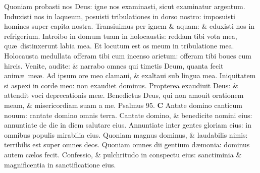 \documentclass[a5paper,10pt]{book}
\def\ae{æ}
\begin{document}
\begin{multicols*}{2}
\newline \color{red} Q\color{black}uoniam probasti nos Deus: igne nos examinasti, sicut examinatur argentum.
\newline \color{red} I\color{black}nduxisti nos in laqueum, posuisti tribulationes in dorso nostro: imposuisti homines super capita nostra.
\newline \color{red} T\color{black}ransiuimus per ignem \& aquam: \& eduxisti nos in refrigerium.
\newline \color{red} I\color{black}ntroibo in domum tuam in holocaustis: reddam tibi vota mea, qu\ae \ distinxerunt labia mea.
\newline \color{red} E\color{black}t locutum est os meum in tribulatione mea.
\newline \color{red} H\color{black}olocausta medullata offeram tibi cum incenso arietum: offeram tibi boues cum hircis.
\newline \color{red} V\color{black}enite, audite: \& narrabo omnes qui timetis Deum, quanta fecit anim\ae \ me\ae .
\newline \color{red} A\color{black}d ipsum ore meo clamaui, \& exaltaui sub lingua mea.%
\newline \color{red} I\color{black}niquitatem si aspexi in corde meo: non exaudiet dominus.
\newline \color{red} P\color{black}ropterea exaudiuit Deus: \& attendit voci deprecationis me\ae .
\newline \color{red} B\color{black}enedictus Deus, qui non amouit orationem meam, \& misericordiam suam a me. \quad \color{red} Psalmus 95. \color{black}
\vspace{-1em}
\lettrine[lines=2]{\bfseries \color{red} C}{}
Antate domino canticum nouum: cantate domino omnis terra.
\newline \color{red} C\color{black}antate domino, \& benedicite nomini eius: annuntiate de die in diem salutare eius.
\newline \color{red} A\color{black}nnuntiate inter gentes gloriam eius: in omnibus populis mirabilia eius.
\newline \color{red} Q\color{black}uoniam magnus dominus, \& laudabilis nimis: terribilis est super omnes deos.
\newline \color{red} Q\color{black}uoniam omnes dii gentium d\ae monia: dominus autem c\ae los fecit.
\newline \color{red} C\color{black}onfessio, \& pulchritudo in conspectu eius: sanctiminia \& magnificentia in sanctificatione eius.

\end{multicols*}
\end{document}
